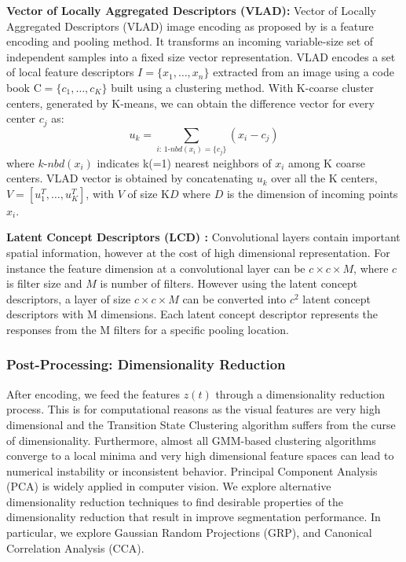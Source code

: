 \vspace{0.25em}
\noindent\textbf{Vector of Locally Aggregated Descriptors (VLAD)\cite{arandjelovic2013all}: }
Vector of Locally Aggregated Descriptors (VLAD) image encoding as proposed by is a feature encoding and pooling method. 
It transforms an incoming variable-size set of independent samples into a fixed size vector representation.
VLAD encodes a set of local feature descriptors $I=\{x_1,\ldots,x_n\}$ extracted from an image using a code book $\mathrm{C} = \{c_1, \ldots, c_K \}$ built using a clustering method. With K-coarse cluster centers, generated by K-means, we can obtain the difference vector for every center $c_j$ as:\vspace{-5pt}
\[ u_k = \sum_{i:\,1\text{-}nbd(x_i)=\{c_j\}} (x_i- c_j)
\]
where $k\text{-}nbd(x_i)$ indicates k(=1) nearest neighbors of $x_i$ among K coarse centers.
VLAD vector is obtained by concatenating $u_k$ over all the K centers, $V = [u_1^T, \ldots, u_K^T]$, with $V$ of size K$D$ where $D$ is the dimension of incoming points $x_i$. 

\vspace{0.25em}
\noindent\textbf{Latent Concept Descriptors (LCD) \cite{xu2014discriminative}: }
Convolutional layers contain important spatial information, however at the cost of high dimensional representation. For instance the feature dimension at a convolutional layer can be $c\times c \times M$, where $c$ is filter size and $M$ is number of filters. However using the latent concept descriptors, a layer of size $c\times c \times M$ can be converted into $c^2$ latent concept descriptors with M dimensions. Each latent concept descriptor represents the responses from the M filters for a specific pooling location. 

\subsubsection{Post-Processing: Dimensionality Reduction}
After encoding, we feed the features $z(t)$ through a dimensionality reduction process.
This is for computational reasons as the visual features are very high dimensional and the Transition State Clustering algorithm suffers from the curse of dimensionality.
Furthermore, almost all GMM-based clustering algorithms converge to a local minima and very high dimensional feature spaces can lead to numerical instability or inconsistent behavior.
Principal Component Analysis (PCA) is widely applied in computer vision. 
We explore alternative dimensionality reduction techniques to find desirable properties of the dimensionality reduction that result in improve segmentation performance.
In particular, we explore Gaussian Random Projections (GRP), and Canonical Correlation Analysis (CCA).

